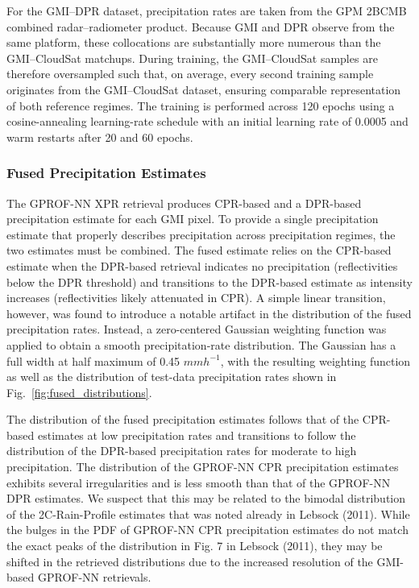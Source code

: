 \documentclass{ametsocV6.1}
\begin{document}
For the GMI–DPR dataset, precipitation rates are taken from the GPM 2BCMB \citep{grecu2016gpm}
combined radar–radiometer product. Because GMI and DPR observe from the same
platform, these collocations are substantially more numerous than the
GMI–CloudSat matchups. During training, the GMI–CloudSat samples are therefore
oversampled such that, on average, every second training sample originates from
the GMI–CloudSat dataset, ensuring comparable representation of both reference
regimes. The training is performed across 120 epochs using a cosine-annealing
learning-rate schedule with an initial learning rate of 0.0005 and warm restarts
after 20 and 60 epochs.

\subsubsection*{Fused Precipitation Estimates}

The GPROF-NN XPR retrieval produces CPR-based and a DPR-based precipitation
estimate for each GMI pixel. To provide a single precipitation estimate that
properly describes precipitation across precipitation regimes, the two estimates
must be combined. The fused estimate relies on the CPR-based estimate when the
DPR-based retrieval indicates no precipitation (reflectivities below the DPR
threshold) and transitions to the DPR-based estimate as intensity increases
(reflectivities likely attenuated in CPR). A simple linear transition, however,
was found to introduce a notable artifact in the distribution of the fused
precipitation rates. Instead, a zero-centered Gaussian weighting function was
applied to obtain a smooth precipitation-rate distribution. The Gaussian has a
full width at half maximum of 0.45 $mm h^{-1}$, with the resulting weighting
function as well as the distribution of test-data precipitation rates shown in
Fig.~\ref{fig:fused_distributions}.

The distribution of the fused precipitation estimates follows that of the
CPR-based estimates at low precipitation rates and transitions to follow the
distribution of the DPR-based precipitation rates for moderate to high
precipitation. The distribution of the GPROF-NN CPR precipitation estimates
exhibits several irregularities and is less smooth than that of the GPROF-NN DPR
estimates. We suspect that this may be related to the bimodal distribution of
the 2C-Rain-Profile estimates that was noted already in Lebsock (2011). While
the bulges in the PDF of GPROF-NN CPR precipitation estimates do not match the
exact peaks of the distribution in Fig. 7 in Lebsock (2011), they may be shifted
in the retrieved distributions due to the increased resolution of the GMI-based
GPROF-NN retrievals.
\end{document}
